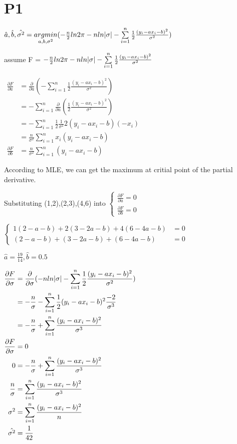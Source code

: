 \documentclass{article}
\begin{document}
\newcommand{\under}[2]{\mathop{#1}\limits_{#2}}
\newcommand{\f}{(y_i-ax_i-b)}

\newcommand{\ff}{\f^2}
\newcommand{\fa}{\frac{\ff}{\sigma^2}}
\newcommand{\fb}{\frac{1}{2}\fa}

\newcommand{\s}{\sum\limits_{i=1}^{n}}
\newcommand{\p}[2]{\frac{\partial #1}{\partial #2}}
\newcommand{\F}{-\frac{n}{2} ln2\pi - nln\abs{\sigma} -\s \frac{1}{2} \frac{\ff}{\sigma^2}}

\newcommand{\B}[1]{\left\{\begin{aligned}#1\end{aligned}\right.}
\newcommand{\E}{\mathrm{E}}
\newcommand{\V}{\mathrm{V}}

\section{P1}

$\hat{a}, \hat{b}, \hat{\sigma^2} = \under{argmin}{a,b,\sigma^2}(\F)$

assume F = $\F$

$
\begin{aligned}
\p{F}{a} & = \p{}{a} (- \s \fb) \\
         & = -\s \p{}{a} (\fb) \\
         & = -\s \frac{1}{2} \frac{1}{\sigma^2} 2 \f (-x_i) \\
         & = \frac{n}{\sigma^2} \s x_i \f \\
\p{F}{b} & = \frac{n}{\sigma^2} \s \f
\end{aligned}
$


According to MLE, we can get the maximum at critial point of the partial derivative.

Substituting (1,2),(2,3),(4,6) into
$\B{
  \p{F}{a} = 0 \\
  \p{F}{b} = 0
}$

$\B{
  1(2-a-b) + 2(3-2a-b) + 4(6-4a-b) & = 0 \\
  (2-a-b) + (3-2a-b) + (6-4a-b)  & = 0
}$

$\hat{a}=\frac{19}{14}, \hat{b}=0.5$

$
\begin{aligned}
\p{F}{\sigma}    & = \p{}{\sigma} (-nln\abs{\sigma} - \s \fb) \\
                 & = -\frac{n}{\sigma} - \s \frac{1}{2} \ff \frac{-2}{\sigma^3} \\
                 & = -\frac{n}{\sigma} + \s \frac{\ff}{\sigma^3} \\
\p{F}{\sigma}    & = 0 \\
               0 & = -\frac{n}{\sigma} + \s \frac{\ff}{\sigma^3} \\
\frac{n}{\sigma} & = \s \frac{\ff}{\sigma^3} \\
        \sigma^2 & = \s \frac{\ff}{n} \\
  \hat{\sigma^2} & = \frac{1}{42}
\end{aligned}
$
\end{document}
